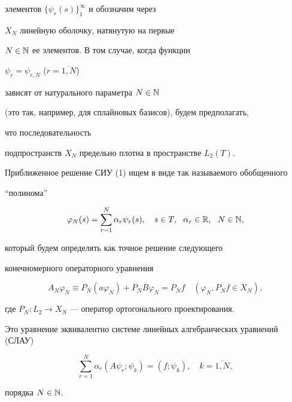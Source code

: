 элементов $ \{ \psi _r(s)\}_1^\infty $ и обозначим через


$ X_N $ линейную оболочку, натянутую на первые


$ N\in \Bbb{N}$ ее элементов. В том случае, когда функции


$\psi _r=\psi _{r,N}$ ($r=\overline{1,N}$)


зависят от натурального параметра $ N\in \Bbb{N} $


(это так, например, для сплайновых базисов), будем предполагать, 


что последовательность


подпространств $ X_N $ предельно плотна в пространстве $ L_2(T) $.


Приближенное решение СИУ (1) ищем в виде так называемого обобщенного


``полинома''


\begin{equation}


\varphi _N(s)=\sum_{r=1}^N\alpha _r \psi _r(s),\quad


s\in T,\ \ \alpha_r\in \Bbb{R},\ \ N\in \Bbb{N},


\end{equation}


который будем определять как точное решение следующего


конечномерного операторного уравнения


\begin{equation}


A_N\varphi _N\equiv P_N(a\varphi _N)+P_N B\varphi _N=


P_N f\quad (\varphi _N, P_N f\in X_N),


\end{equation}


где $ P_N:L_2\to X_N $ --- оператор ортогонального проектирования.


Это уравнение эквивалентно системе линейных алгебраических уравнений (СЛАУ)


\begin{equation}


\sum_{r=1}^N\alpha _r (A\psi _r;\psi _k) = (f;\psi _k) ,\quad


k=\overline{1,N},


\end{equation}


порядка $N\in\Bbb {N}$.








